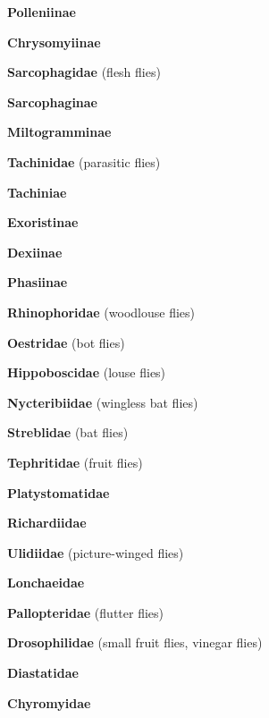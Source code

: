 \documentclass[letterpaper,10pt]{article}
\begin{document}
{\makebox[0.8cm]{}  \textbf{Polleniinae} \par
\makebox[0.8cm]{}  \textbf{Chrysomyiinae} \par
\makebox[0.6cm]{}  \textbf{Sarcophagidae} (flesh flies) \par
\makebox[0.8cm]{}  \textbf{Sarcophaginae} \par
\makebox[0.8cm]{}  \textbf{Miltogramminae} \par
\makebox[0.6cm]{}  \textbf{Tachinidae} (parasitic flies) \par
\makebox[0.8cm]{}  \textbf{Tachiniae} \par
\makebox[0.8cm]{}  \textbf{Exoristinae} \par
\makebox[0.8cm]{}  \textbf{Dexiinae} \par
\makebox[0.8cm]{}  \textbf{Phasiinae} \par
\makebox[0.6cm]{}  \textbf{Rhinophoridae} (woodlouse flies) \par
\makebox[0.6cm]{}  \textbf{Oestridae} (bot flies) \par
\makebox[0.6cm]{}  \textbf{Hippoboscidae} (louse flies) \par
\makebox[0.6cm]{}  \textbf{Nycteribiidae} (wingless bat flies) \par
\makebox[0.6cm]{}  \textbf{Streblidae} (bat flies) \par
\makebox[0.6cm]{}  \textbf{Tephritidae} (fruit flies) \par
\makebox[0.6cm]{}  \textbf{Platystomatidae} \par
\makebox[0.6cm]{}  \textbf{Richardiidae} \par
\makebox[0.6cm]{}  \textbf{Ulidiidae} (picture-winged flies) \par
\makebox[0.6cm]{}  \textbf{Lonchaeidae} \par
\makebox[0.6cm]{}  \textbf{Pallopteridae} (flutter flies) \par
\makebox[0.6cm]{}  \textbf{Drosophilidae} (small fruit flies, vinegar flies) \par
\makebox[0.6cm]{}  \textbf{Diastatidae} \par
\makebox[0.6cm]{}  \textbf{Chyromyidae} \par
}
\end{document}
